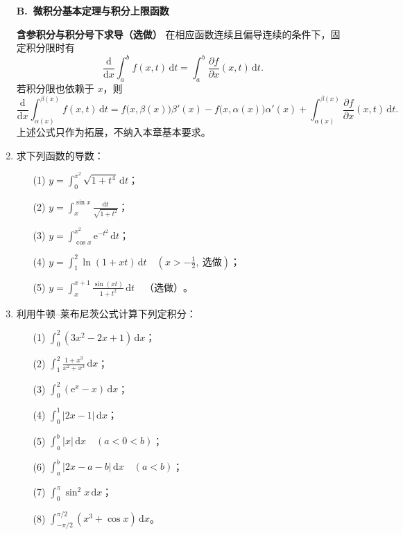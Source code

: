 \documentclass[fontset=fandol]{ctexart}
\newcommand{\dd}{\mathrm{d}}
\newcommand{\ee}{\mathrm{e}}
\begin{document}
\begin{enumerate}
\item[]\textbf{B.\ 微积分基本定理与积分上限函数}
\setcounter{enumi}{0}
\par\smallskip
\noindent\textbf{含参积分与积分号下求导（选做）}\quad
在相应函数连续且偏导连续的条件下，固定积分限时有
\[
\frac{\dd}{\dd x}\int_a^b f(x,t)\,\dd t
=\int_a^b\frac{\partial f}{\partial x}(x,t)\,\dd t.
\]
若积分限也依赖于 $x$，则
\[
\frac{\dd}{\dd x}\int_{\alpha(x)}^{\beta(x)}f(x,t)\,\dd t
=f\bigl(x,\beta(x)\bigr)\beta'(x)
-f\bigl(x,\alpha(x)\bigr)\alpha'(x)
+\int_{\alpha(x)}^{\beta(x)}\frac{\partial f}{\partial x}(x,t)\,\dd t.
\]
上述公式只作为拓展，不纳入本章基本要求。
\item 求下列函数的导数：
\begin{enumerate}
\item[(1)] $\displaystyle y=\int_0^{x^2}\sqrt{1+t^4}\,\dd t$；
\item[(2)] $\displaystyle y=\int_x^{\sin x}\frac{\dd t}{\sqrt{1+t^2}}$；
\item[(3)] $\displaystyle y=\int_{\cos x}^{x^2}\ee^{-t^2}\,\dd t$；
\item[(4)] $\displaystyle y=\int_1^2\ln(1+xt)\,\dd t\quad\left(x>-\frac12,\ \text{选做}\right)$；
\item[(5)] $\displaystyle y=\int_{x}^{x+1}\frac{\sin(xt)}{1+t^2}\,\dd t\quad\text{（选做）}$。
\end{enumerate}

\item 利用牛顿--莱布尼茨公式计算下列定积分：
\begin{enumerate}
\item[(1)] $\displaystyle \int_0^2(3x^2-2x+1)\,\dd x$；
\item[(2)] $\displaystyle \int_1^2\frac{1+x^3}{x^2+x^3}\,\dd x$；
\item[(3)] $\displaystyle \int_0^2(\ee^x-x)\,\dd x$；
\item[(4)] $\displaystyle \int_0^1|2x-1|\,\dd x$；
\item[(5)] $\displaystyle \int_a^b|x|\,\dd x\quad(a<0<b)$；
\item[(6)] $\displaystyle \int_a^b|2x-a-b|\,\dd x\quad(a<b)$；
\item[(7)] $\displaystyle \int_0^\pi \sin^2x\,\dd x$；
\item[(8)] $\displaystyle \int_{-\pi/2}^{\pi/2}(x^3+\cos x)\,\dd x$。
\end{enumerate}


\end{enumerate}
\end{document}
